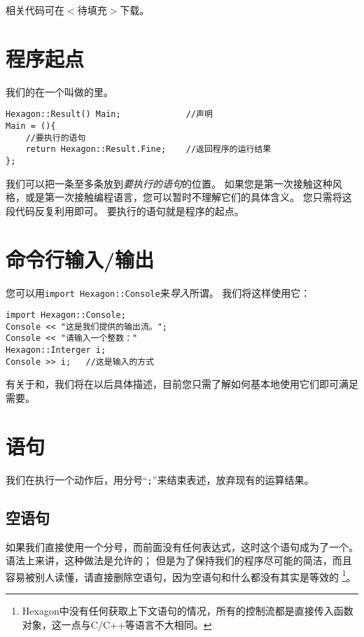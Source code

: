 \documentclass[a4paper]{tufte-book}
\begin{document}
		相关代码可在$<$待填充$>$下载。
		
		\section{程序起点}
			我们的在一个叫做的里。
			\begin{lstlisting}[caption={main函数的标准形式}]
Hexagon::Result() Main; 			//声明
Main = (){
	//要执行的语句
	return Hexagon::Result.Fine;	//返回程序的运行结果
};
			\end{lstlisting}
			我们可以把一条至多条放到\emph{要执行的语句}的位置。
			如果您是第一次接触这种风格，或是第一次接触编程语言，您可以暂时不理解它们的具体含义。
			您只需将这段代码反复利用即可。
			要执行的语句就是程序的起点。
			
		\section{命令行输入/输出}
			您可以用\verb|import Hexagon::Console|来\emph{导入}所谓。
			我们将这样使用它：
			\begin{lstlisting}[caption={输入/输出流}]
import Hexagon::Console;
Console << "这是我们提供的输出流。";
Console << "请输入一个整数："
Hexagon::Interger i;
Console >> i; 	//这是输入的方式
			\end{lstlisting}
			有关于和，我们将在以后具体描述，目前您只需了解如何基本地使用它们即可满足需要。
			
		\section{语句}
			我们在执行一个动作后，用分号“\verb|;|”来结束表述，放弃现有的运算结果。
			\subsection{空语句}
				如果我们直接使用一个分号，而前面没有任何表达式，这时这个语句成为了一个。
				语法上来讲，这种做法是允许的；
				但是为了保持我们的程序尽可能的简洁，而且容易被别人读懂，请直接删除空语句，因为空语句和什么都没有其实是等效的
				\footnote{Hexagon中没有任何获取上下文语句的情况，所有的控制流都是直接传入函数对象，这一点与C/C++等语言不大相同。}。
			
\end{document}
